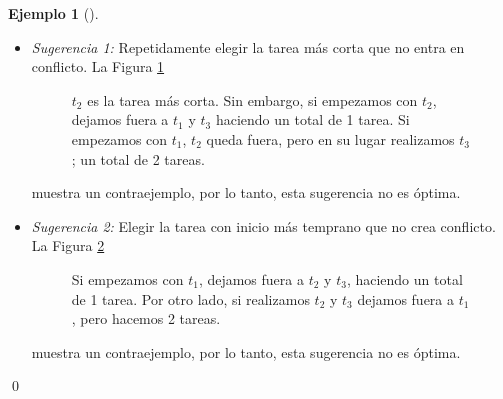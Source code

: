 \documentclass[english, spanish, fleqn, 10pt]{article}
\numberwithin{equation}{section}
\theoremstyle{definition}
\newtheorem{beforeExample}{Ejemplo}[section]
\newenvironment{ejemplo}[1][]{\begin{beforeExample}[#1]\renewcommand{\qedsymbol}{$\blacksquare$}}{\qed\end{beforeExample}}
\begin{document}
\begin{ejemplo}
	\begin{itemize}
		\item \emph{Sugerencia 1:} Repetidamente elegir la tarea más corta que no entra en conflicto. La Figura \ref{07::Tareas2}
		\begin{figure}[!h]
			\centering
			\newcommand{\lineaTarea}[3]{\draw (#1, 0.15+#2) -- (#1, -0.15+#2) -- (#1, #2) -- (#1+#3, #2) -- (#1+#3, 0.15+#2) -- (#1+#3, -0.15+#2)} %
			\caption{$t_2$ es la tarea más corta. Sin embargo, si empezamos con $t_2$, dejamos fuera a $t_1$ y $t_3$ haciendo un total de 1 tarea. Si empezamos con $t_1$, $t_2$ queda fuera, pero en su lugar realizamos $t_3$; un total de 2 tareas.}
			\label{07::Tareas2}
		\end{figure}
	 muestra un contraejemplo, por lo tanto, esta sugerencia no es óptima.
	 
	 \item \emph{Sugerencia 2:}  Elegir la tarea con inicio más temprano que no crea conflicto. La Figura \ref{07::Tareas3}
	\begin{figure}[!h]
		\centering
		\newcommand{\lineaTarea}[3]{\draw (#1, 0.15+#2) -- (#1, -0.15+#2) -- (#1, #2) -- (#1+#3, #2) -- (#1+#3, 0.15+#2) -- (#1+#3, -0.15+#2)} %
		\caption{Si empezamos con $t_1$, dejamos fuera a $t_2$ y $t_3$, haciendo un total de 1 tarea. Por otro lado, si realizamos $t_2$ y $t_3$ dejamos fuera a $t_1$, pero hacemos 2 tareas.}
		\label{07::Tareas3}
	\end{figure}
	 muestra un contraejemplo, por lo tanto, esta sugerencia no es óptima.
	 

\end{itemize}
\end{ejemplo}
\end{document}
